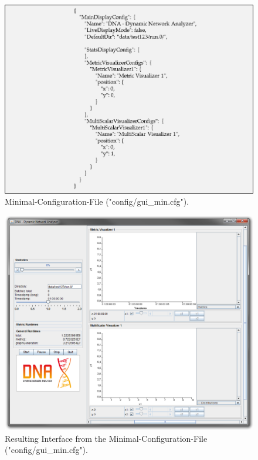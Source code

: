 \begin{figure} [h]
\centering
\includegraphics [scale=1] {images/mincfg}
\caption{Minimal-Configuration-File ("config/gui{\_}min.cfg").}
\label{fig:mincfg}
\end{figure}

\begin{figure} [h]
\centering
\includegraphics [scale=0.5] {images/mincfgex}
\caption{Resulting Interface from the Minimal-Configuration-File ("config/gui{\_}min.cfg").}
\label{fig:mincfgex}
\end{figure}

